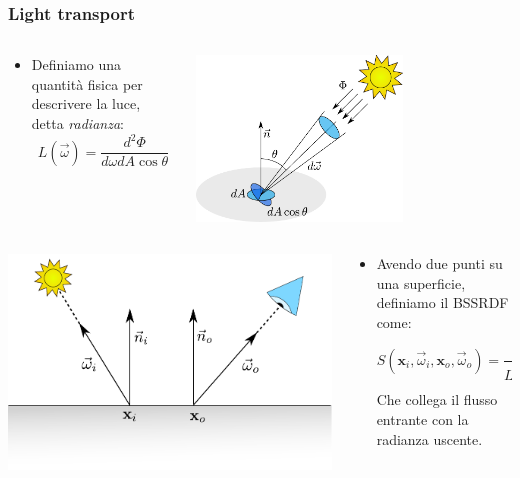 \documentclass{beamer}
\newcommand{\vomega}{\vec{\omega}}
\newcommand{\x}{\mathbf{x}}
\begin{document}
\begin{frame}
    \frametitle{Light transport}
				\vspace{0.5cm}

\begin{columns}
    \begin{column}{0.5\textwidth}
			\begin{itemize}
				\item Definiamo una quantità fisica per descrivere la luce, detta \emph{radianza}:
			  $$L(\vomega) = \frac{d^2 \Phi}{d\omega dA \cos \theta}$$
			\end{itemize}
    \end{column}
    \begin{column}{0.5\textwidth}
		\centering
		\includegraphics[width=0.7\textwidth]{radiance}
    \end{column}
​  \end{columns}
\vspace{0.3cm}
\begin{columns}
    \begin{column}{0.4\textwidth}
      \centering
		\includegraphics[width=\textwidth]{bssrdf}
				\end{column}
    \begin{column}{0.6\textwidth}
				\begin{itemize}
				\item Avendo due punti su una superficie, definiamo il BSSRDF come:
$$
S(\x_i, \vomega_i, \x_o, \vomega_o) = \frac{d L_o(\x_o,\vomega_o)}{L_i(\x_i,\vomega_i) \cos \theta_i d\vomega_i d A_i}  
$$			
				Che collega il flusso entrante con la radianza uscente.
\end{itemize}


\end{column}
\end{columns}
\end{frame}
\end{document}
